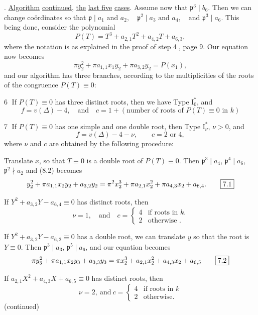 \begingroup
\makeatletter\tagsleft@true{}. \uline{Algorithm} \uline{continued}, \uline{the} \uline{last five} \uline{cases}. Assume now that $\boxed{\mathfrak p^3\mid b_6}$. Then we can change coördinates so that $\boxed{\mathfrak p\mid a_1\text{ and }a_2,\quad \mathfrak p^2\mid a_3\text{ and }a_4,\quad \text{and }\mathfrak p^3\mid a_6}$. This being done, consider the polynomial
\[
 P(T)=T^3+a_{2,1}T^2+a_{4,2}T+a_{6,3},
 \tag*{(8.1)}
\]
where the notation is as explained in the proof of step \textcircled{4}, page $9$. Our equation now becomes
\[
 \pi y_2^2+\pi a_{1,1}x_1y_2+\pi a_{3,2}y_2=P(x_1),
 \tag*{(8.2)}
\]
and our algorithm has three branches, according to the multiplicities of the roots of the congruence $P(T)\equiv0$:

\reversemarginpar
{}\textcircled{6} If $P(T)\equiv0$ has three distinct roots, then we have Type $\mathrm I_0^{*}$, and
\[
 f=v(\Delta)-4,\quad\text{and}\quad c=1+(\text{number of roots of }P(T)\equiv0\text{ in }k)
\]

\textcircled{7} If $P(T)\equiv0$ has one simple and one double root, then Type $\mathrm I_{\nu}^{*}$, $\nu>0$, and
\[
 f=v(\Delta)-4-\nu,\qquad c=2\text{ or }4,
\]
where $\nu$ and $c$ are obtained by the following procedure:

%
Translate $x$, so that $T\equiv0$ is a double root of $P(T)\equiv0$. Then $\mathfrak p^3\mid a_4$, $\mathfrak p^4\mid a_6$, $\mathfrak p^2\nmid a_2$ and (8.2) becomes
\[
 y_2^2+\pi a_{1,1}x_2y_2+a_{3,2}y_2
 =\pi^2x_2^3+\pi a_{2,1}x_2^2+\pi a_{4,3}x_2+a_{6,4}.
 \tag*{\fbox{7.1}}
\]

If $Y^2+a_{3,2}Y-a_{6,4}\equiv0$ has distinct roots, then
\[
 \nu=1,\quad\text{and}\quad c=\begin{cases}4&\text{if roots in }k.\\2&\text{otherwise }.\end{cases}
\]

If $Y^2+a_{3,2}Y-a_{6,2}\equiv0$ has a double root, we can translate $y$ so that the root is $Y\equiv0$. Then $\mathfrak p^3\mid a_3$, $\mathfrak p^5\mid a_6$, and our equation becomes
\[
 \pi y_3^2+\pi a_{1,1}x_2y_3+a_{3,3}y_3
 =\pi x_2^3+a_{2,1}x_2^2+a_{4,3}x_2+a_{6,5}
 \tag*{\fbox{7.2}}
\]

If $a_{2,1}X^2+a_{4,3}X+a_{6,5}\equiv0$ has distinct roots, then
\[
 \nu=2,\ \text{and}\ c=\begin{cases}4&\text{if roots in }k\\2&\text{otherwise}.\end{cases}
\]
\normalmarginpar
\hfill(continued)
\endgroup
